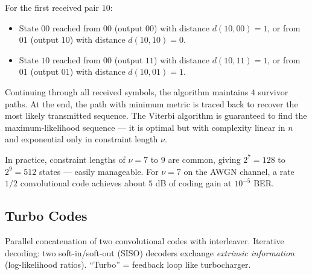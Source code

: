 \begin{example}
For the first received pair $10$:
\begin{itemize}
\item State $00$ reached from $00$ (output $00$) with distance $d(10,00)=1$, or from $01$ (output $10$) with distance $d(10,10)=0$.
\item State $10$ reached from $00$ (output $11$) with distance $d(10,11)=1$, or from $01$ (output $01$) with distance $d(10,01)=1$.
\end{itemize}

Continuing through all received symbols, the algorithm maintains $4$ survivor paths. At the end, the path with minimum metric is traced back to recover the most likely transmitted sequence. The Viterbi algorithm is guaranteed to find the maximum-likelihood sequence — it is optimal but with complexity linear in $n$ and exponential only in constraint length $\nu$.

In practice, constraint lengths of $\nu = 7$ to $9$ are common, giving $2^7=128$ to $2^9=512$ states — easily manageable. For $\nu = 7$ on the AWGN channel, a rate $1/2$ convolutional code achieves about $5$ dB of coding gain at $10^{-5}$ BER.
\end{example}

\subsection{Turbo Codes}
\label{sec:ec:turbo}

Parallel concatenation of two convolutional codes with interleaver. Iterative decoding: two soft-in/soft-out (SISO) decoders exchange \emph{extrinsic information} (log-likelihood ratios). ``Turbo'' = feedback loop like turbocharger.

